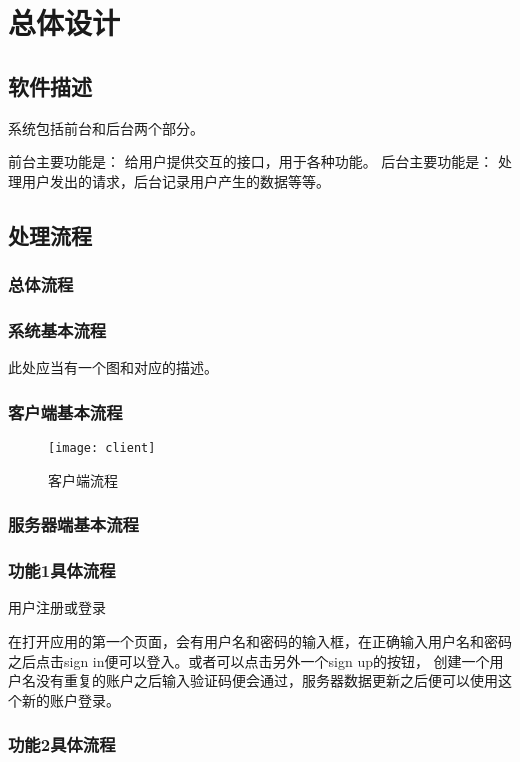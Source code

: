\chapter{总体设计}
\section{软件描述}
系统包括前台和后台两个部分。

前台主要功能是：
给用户提供交互的接口，用于各种功能。
后台主要功能是：
处理用户发出的请求，后台记录用户产生的数据等等。

\section{处理流程}
\subsection{总体流程}

\subsection{系统基本流程}
此处应当有一个图和对应的描述。

\subsection{客户端基本流程}
\begin{figure}[ht]
	\centering
	\texttt{[image: client]}
	\caption{客户端流程} \label{fig:figure1}
\end{figure}


\subsection{服务器端基本流程}


\subsection{功能1具体流程}

用户注册或登录

在打开应用的第一个页面，会有用户名和密码的输入框，在正确输入用户名和密码之后点击sign in便可以登入。或者可以点击另外一个sign up的按钮，
创建一个用户名没有重复的账户之后输入验证码便会通过，服务器数据更新之后便可以使用这个新的账户登录。


\subsection{功能2具体流程}

